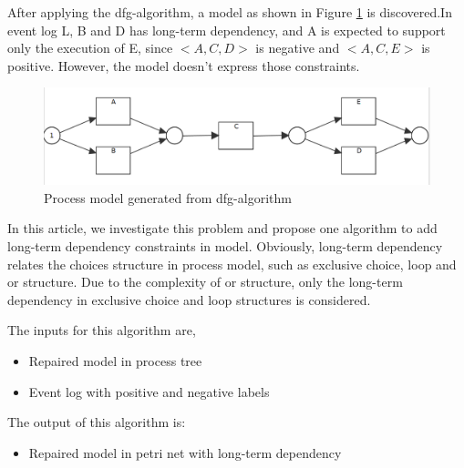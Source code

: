 \documentclass[]{article}
\begin{document}
After applying the dfg-algorithm, a model as shown in Figure \ref{fig:pn_without_lt_exm01} is discovered.In event log L, B and D has long-term dependency, and A is expected to support only the execution of E, since $<A,C,D>$ is negative and $<A,C,E>$ is positive. However, the model doesn't express those constraints.
\begin{figure}[h!]
	\includegraphics[width=\textwidth]{PN06_Seq_2_xor_notnested.png}
	\caption{Process model generated from dfg-algorithm}
	\label{fig:pn_without_lt_exm01}
\end{figure}
In this article, we investigate this problem and propose one algorithm to add long-term dependency constraints in model. Obviously, long-term dependency relates the choices structure in process model, such as exclusive choice, loop and or structure. Due to the complexity of or structure, only the long-term dependency in exclusive choice and loop structures is considered. 

The inputs for this algorithm are,
\begin{itemize}
	\item Repaired model in process tree
	\item Event log with positive and negative labels
\end{itemize}
The output of this algorithm is: 
\begin{itemize}
	\item Repaired model in petri net with long-term dependency
\end{itemize}
\end{document}
